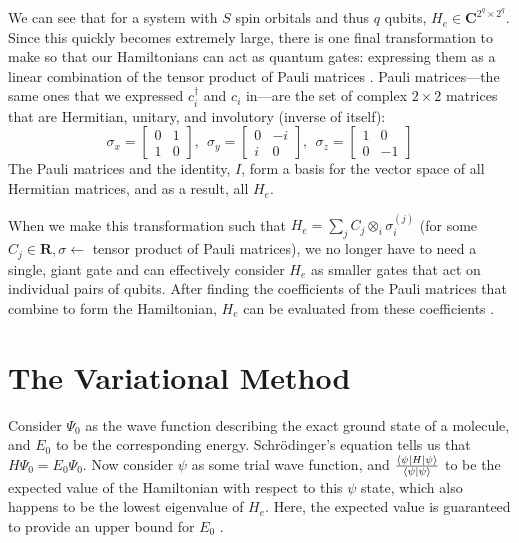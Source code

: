 \documentclass[11pt]{article}
\begin{document}
We can see that for a system with $S$ spin orbitals and thus $q$ qubits, $H_e \in \mathbf{C}^{2^q\times 2^q}$. Since this quickly becomes extremely large, there is one final transformation to make so that our Hamiltonians can act as quantum gates: expressing them as a linear combination of the tensor product of Pauli matrices \cite{Delgado-Hamiltonians}. Pauli matrices---the same ones that we expressed $c^{\dagger}_i$ and $c_i$ in---are the set of complex  $2 \times 2$ matrices that are Hermitian, unitary, and involutory (inverse of itself):
$$
\sigma_x = \left[\begin{array}{cc}
   0  &  1 \\
   1  &  0
\end{array} \right],  \:\:
\sigma_y = \left[\begin{array}{cc}
   0  &  -i \\
   i  &  0
\end{array} \right], \:\:
\sigma_z = \left[\begin{array}{cc}
   1  &  0 \\
   0  &  -1
\end{array} \right]
$$
The Pauli matrices and the identity, $I$, form a basis for the vector space of all Hermitian matrices, and as a result, all $H_e$.

When we make this transformation such that $H_e = \sum_j C_j \otimes_i \sigma_i^{(j)}$ (for some $C_j \in \mathbf{R}, \sigma \leftarrow $ tensor product of Pauli matrices), we no longer have to need a single, giant gate and can effectively consider $H_e$ as smaller gates that act on individual pairs of qubits. After finding the coefficients of the Pauli matrices that combine to form the Hamiltonian, $H_e$ can be evaluated from these coefficients \cite{Rongxin}. 

\section{The Variational Method}
Consider $\Psi_0$ as the wave function describing the exact ground state of a molecule, and $E_0$ to be the corresponding energy. Schrödinger's equation tells us that $H\Psi_0 = E_0\Psi_0$. Now consider $\psi$ as some trial wave function, and $\frac{\braket{\psi|H|\psi}}{\braket{\psi|\psi}}$ to be the expected value of the Hamiltonian with respect to this $\psi$ state, which also happens to be the lowest eigenvalue of $H_e$. Here, the expected value is guaranteed to provide an upper bound for $E_0$ \cite{Berekely}. 
\end{document}
